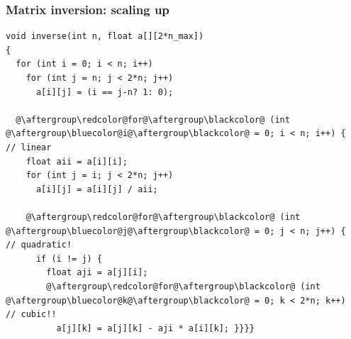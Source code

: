 \documentclass[xcolor=dvipsnames]{beamer}
\begin{document}
\begin{frame}[fragile]
  \frametitle{Matrix inversion: scaling up}
\begin{lstlisting}[basicstyle=\small\ttfamily]
void inverse(int n, float a[][2*n_max])
{
  for (int i = 0; i < n; i++)
    for (int j = n; j < 2*n; j++)
      a[i][j] = (i == j-n? 1: 0);

  @\aftergroup\redcolor@for@\aftergroup\blackcolor@ (int @\aftergroup\bluecolor@i@\aftergroup\blackcolor@ = 0; i < n; i++) {         // linear
    float aii = a[i][i];
    for (int j = i; j < 2*n; j++)
      a[i][j] = a[i][j] / aii;

    @\aftergroup\redcolor@for@\aftergroup\blackcolor@ (int @\aftergroup\bluecolor@j@\aftergroup\blackcolor@ = 0; j < n; j++) {       // quadratic!
      if (i != j) {
        float aji = a[j][i];
        @\aftergroup\redcolor@for@\aftergroup\blackcolor@ (int @\aftergroup\bluecolor@k@\aftergroup\blackcolor@ = 0; k < 2*n; k++)   // cubic!!
          a[j][k] = a[j][k] - aji * a[i][k]; }}}}
\end{lstlisting}
\end{frame}
\end{document}
